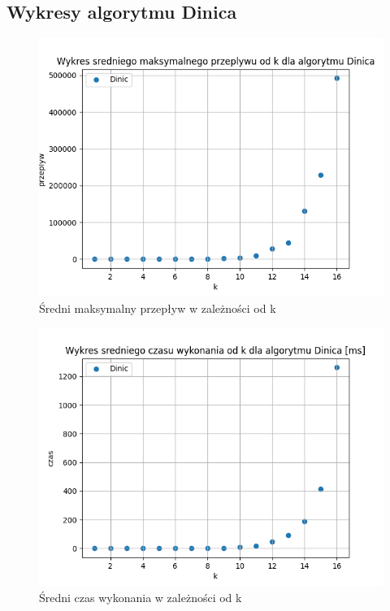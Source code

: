 \documentclass{report}
\begin{document}
\subsection*{Wykresy algorytmu Dinica}
\begin{figure}[H]
    \centering
    \includegraphics[scale=0.55]{../ex1_and_4/plots/dinic_maxflow.png}
    \caption{Średni maksymalny przepływ w zależności od k}
\end{figure}
\begin{figure}[H]
    \centering
    \includegraphics[scale=0.55]{../ex1_and_4/plots/dinic_time.png}
    \caption{Średni czas wykonania w zależności od k}
\end{figure}
\end{document}
